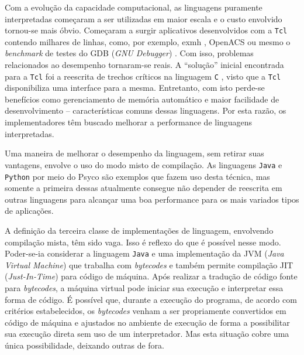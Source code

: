 Com a evolução da capacidade computacional, as linguagens
puramente interpretadas começaram a ser utilizadas em maior
escala e o custo envolvido tornou-se mais óbvio.
Começaram a surgir aplicativos desenvolvidos com a
\texttt{Tcl} contendo milhares de linhas,
como, por exemplo, exmh \cite{exmh}, OpenACS \cite{openacs} ou mesmo o
\textit{benchmark} de testes do GDB (\textit{GNU Debugger})
\cite{gdb_testsuite}.
Com isso, problemas relacionados ao desempenho tornaram-se reais.
A ``solução'' inicial
encontrada para a \texttt{Tcl} foi a
reescrita de trechos críticos na
linguagem \texttt{C} \cite{krbook}, visto que a \texttt{Tcl}
disponibiliza uma interface para a mesma. Entretanto, com isto perde-se
benefícios como gerenciamento de memória automático e maior facilidade
de desenvolvimento -- características comuns dessas linguagens.
Por esta razão, os implementadores têm
buscado melhorar a performance de linguagens interpretadas.

Uma maneira de melhorar o desempenho da linguagem, sem retirar suas
vantagens, envolve o uso do modo
misto de compilação. As linguagens \texttt{Java} \cite{javaspec} e
\texttt{Python} \cite{pythonspec} por meio do Psyco \cite{psyco} são exemplos
que fazem uso desta técnica, mas somente a primeira dessas
atualmente consegue não depender de reescrita em outras linguagens
para alcançar uma boa performance para os mais variados tipos
de aplicações.

A definição da terceira classe de implementações de linguagem,
envolvendo compilação
mista, têm sido vaga. Isso é reflexo do que é possível nesse
modo. Poder-se-ia considerar a linguagem \texttt{Java} e uma
implementação da JVM (\textit{Java Virtual Machine}) \cite{jvmspec}
que trabalha com \textit{bytecodes} e também permite compilação JIT
(\textit{Just-In-Time}) 
para código de máquina. Após realizar a
tradução de código fonte para \textit{bytecodes}, a máquina virtual
pode iniciar sua execução e interpretar essa forma de código.
É possível que, durante a execução do programa,
de acordo com critérios estabelecidos, os \textit{bytecodes} venham a
ser propriamente convertidos em código de máquina e ajustados no
ambiente de execução de forma
a possibilitar sua execução direta sem uso de um interpretador.
Mas esta situação cobre uma única possibilidade, deixando outras de fora.

